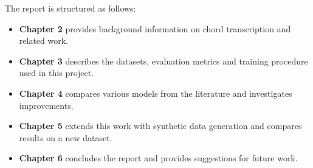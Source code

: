 The report is structured as follows:

\begin{itemize}
    \item \textbf{Chapter 2} provides background information on chord transcription and related work.
    \item \textbf{Chapter 3} describes the datasets, evaluation metrics and training procedure used in this project.
    \item \textbf{Chapter 4} compares various models from the literature and investigates improvements.
    \item \textbf{Chapter 5} extends this work with synthetic data generation and compares results on a new dataset.
    \item \textbf{Chapter 6} concludes the report and provides suggestions for future work.
\end{itemize}